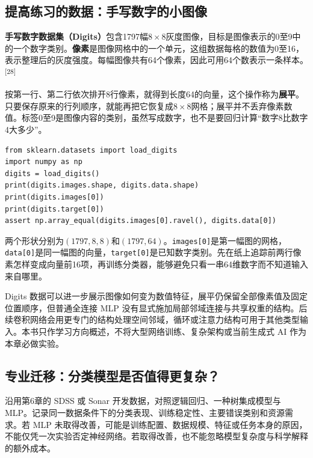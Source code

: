 \subsection*{提高练习的数据：手写数字的小图像}
\label{sec:digits-intro}
\textbf{手写数字数据集（Digits）}包含1797幅$8\times8$灰度图像，目标是图像表示的0至9中的一个数字类别。\textbf{像素}是图像网格中的一个单元，这组数据每格的数值为0至16，表示整理后的灰度强度。每幅图像共有64个像素，因此可用64个数表示一条样本。\textsuperscript{[28]}

按第一行、第二行依次排开8行像素，就得到长度64的向量，这个操作称为\textbf{展平}。只要保存原来的行列顺序，就能再把它恢复成$8\times8$网格；展平并不丢弃像素数值。标签0至9是图像内容的类别，虽然写成数字，也不是要回归计算“数字8比数字4大多少”。

\begin{lstlisting}[caption={查看图像数组与展平后的同一条样本}]
from sklearn.datasets import load_digits
import numpy as np
digits = load_digits()
print(digits.images.shape, digits.data.shape)
print(digits.images[0])
print(digits.target[0])
assert np.array_equal(digits.images[0].ravel(), digits.data[0])
\end{lstlisting}
两个形状分别为$(1797,8,8)$和$(1797,64)$。\texttt{images[0]}是第一幅图的网格，\texttt{data[0]}是同一幅图的向量，\texttt{target[0]}是已知数字类别。先在纸上追踪前两行像素怎样变成向量前16项，再训练分类器，能够避免只看一串64维数字而不知道输入来自哪里。


Digits 数据可以进一步展示图像如何变为数值特征，展平仍保留全部像素值及固定位置顺序，但普通全连接 MLP 没有显式施加局部邻域连接与共享权重的结构。后续卷积网络会用更专门的结构处理空间邻域，循环或注意力结构可用于其他类型输入。本书只作学习方向概述，不将大型网络训练、复杂架构或当前生成式 AI 作为本章必做实验。

\subsection*{专业迁移：分类模型是否值得更复杂？}
沿用第6章的 SDSS 或 Sonar 开发数据，对照逻辑回归、一种树集成模型与 MLP。记录同一数据条件下的分类表现、训练稳定性、主要错误类别和资源需求。若 MLP 未取得改善，可能是训练配置、数据规模、特征或任务本身的原因，不能仅凭一次实验否定神经网络。若取得改善，也不能忽略模型复杂度与科学解释的额外成本。


